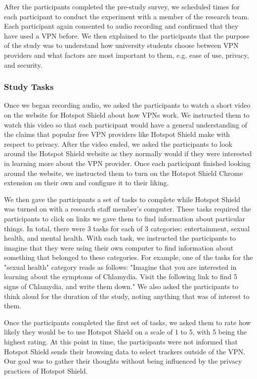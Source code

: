 After the participants completed the pre-study survey, we scheduled times for each participant to conduct the experiment with a member of the research team.
Each participant again consented to audio recording and confirmed that they have used a VPN before.
We then explained to the participants that the purpose of the study was to understand how university students choose between VPN providers and what factors are most important to them, e.g. ease of use, privacy, and security.

\subsubsection{Study Tasks}
Once we began recording audio, we asked the participants to watch a short video on the website for Hotspot Shield about how VPNs work.
We instructed them to watch this video so that each participant would have a general understanding of the claims that popular free VPN providers like Hotspot Shield make with respect to privacy.
After the video ended, we asked the participants to look around the Hotspot Shield website as they normally would if they were interested in learning more about the VPN provider.
Once each participant finished looking around the website, we instructed them to turn on the Hotspot Shield Chrome extension on their own and configure it to their liking.

We then gave the participants a set of tasks to complete while Hotspot Shield was turned on with a research staff member's computer.
These tasks required the participants to click on links we gave them to find information about particular things.
In total, there were 3 tasks for each of 3 categories: entertainment, sexual health, and mental health.
With each task, we instructed the participants to imagine that they were using their own computer to find information about something that belonged to these categories.
For example, one of the tasks for the "sexual health" category reads as follows: "Imagine that you are interested in learning about the symptoms of Chlamydia. Visit the following link to find 5 signs of Chlamydia, and write them down."
We also asked the participants to think aloud for the duration of the study, noting anything that was of interest to them.

Once the participants completed the first set of tasks, we asked them to rate how likely they would be to use Hotspot Shield on a scale of 1 to 5, with 5 being the highest rating.
At this point in time, the participants were not informed that Hotspot Shield sends their browsing data to select trackers outside of the VPN.
Our goal was to gather their thoughts without being influenced by the privacy practices of Hotspot Shield.

